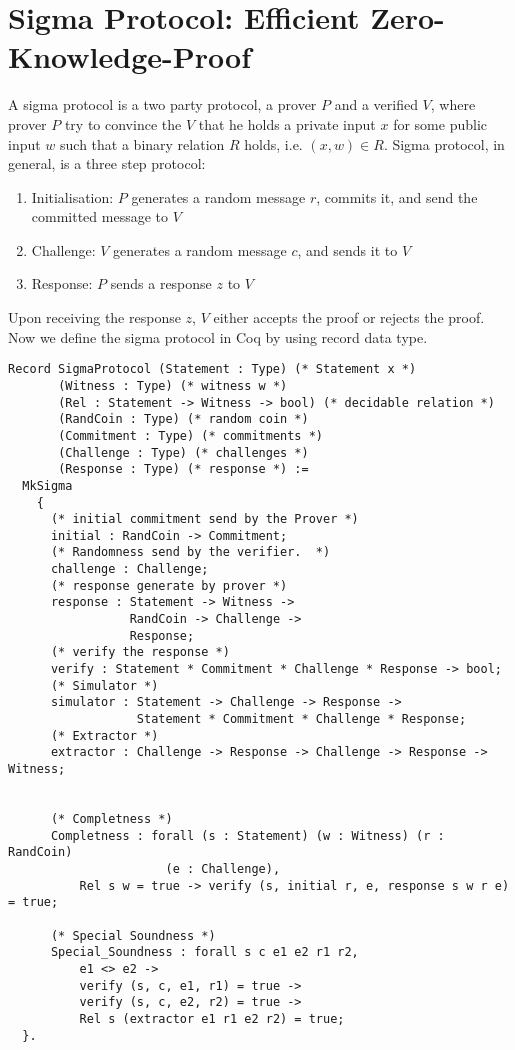  



\section{Sigma Protocol: Efficient Zero-Knowledge-Proof}
\label{sec:sigma_coq}
A sigma protocol is a two party protocol, a prover $P$ and a verified $V$, where prover $P$ try to convince the $V$ that he 
holds a private input $x$ for some public input $w$ such that a binary relation $R$ holds, i.e. $(x, w) \in R$.  Sigma protocol, 
in general, is a three step protocol:
\begin{enumerate}
\item Initialisation: $P$ generates a random message $r$, commits it, and send the committed message to $V$
\item Challenge: $V$ generates a random message $c$, and sends it to $V$
\item Response: $P$ sends a response $z$ to $V$
\end{enumerate} 

\noindent
Upon receiving the response $z$, $V$ either accepts the proof or rejects the proof.  Now we define the sigma protocol in 
Coq by using record data type.

\begin{verbatim}
Record SigmaProtocol (Statement : Type) (* Statement x *)
       (Witness : Type) (* witness w *)
       (Rel : Statement -> Witness -> bool) (* decidable relation *)
       (RandCoin : Type) (* random coin *) 
       (Commitment : Type) (* commitments *)
       (Challenge : Type) (* challenges *) 
       (Response : Type) (* response *) :=
  MkSigma 
    {
      (* initial commitment send by the Prover *)
      initial : RandCoin -> Commitment;
      (* Randomness send by the verifier.  *) 
      challenge : Challenge;
      (* response generate by prover *)
      response : Statement -> Witness ->
                 RandCoin -> Challenge ->
                 Response;
      (* verify the response *)
      verify : Statement * Commitment * Challenge * Response -> bool;
      (* Simulator *)
      simulator : Statement -> Challenge -> Response ->
                  Statement * Commitment * Challenge * Response;
      (* Extractor *)
      extractor : Challenge -> Response -> Challenge -> Response -> Witness;
  

      (* Completness *)
      Completness : forall (s : Statement) (w : Witness) (r : RandCoin)
                      (e : Challenge),
          Rel s w = true -> verify (s, initial r, e, response s w r e) = true;

      (* Special Soundness *)
      Special_Soundness : forall s c e1 e2 r1 r2,
          e1 <> e2 ->
          verify (s, c, e1, r1) = true ->
          verify (s, c, e2, r2) = true ->
          Rel s (extractor e1 r1 e2 r2) = true;
  }.
\end{verbatim}


